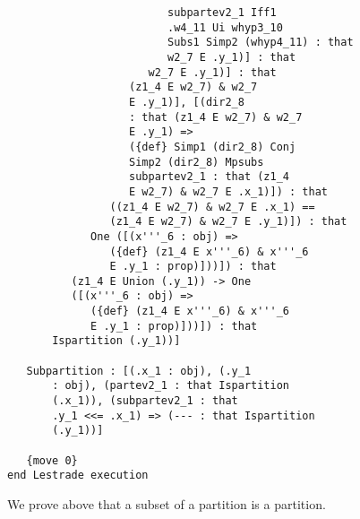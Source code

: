 \documentclass[12pt]{article}
\begin{document}
\begin{verbatim}
                         subpartev2_1 Iff1 
                         .w4_11 Ui whyp3_10 
                         Subs1 Simp2 (whyp4_11) : that 
                         w2_7 E .y_1)] : that 
                      w2_7 E .y_1)] : that 
                   (z1_4 E w2_7) & w2_7 
                   E .y_1)], [(dir2_8 
                   : that (z1_4 E w2_7) & w2_7 
                   E .y_1) => 
                   ({def} Simp1 (dir2_8) Conj 
                   Simp2 (dir2_8) Mpsubs 
                   subpartev2_1 : that (z1_4 
                   E w2_7) & w2_7 E .x_1)]) : that 
                ((z1_4 E w2_7) & w2_7 E .x_1) == 
                (z1_4 E w2_7) & w2_7 E .y_1)]) : that 
             One ([(x'''_6 : obj) => 
                ({def} (z1_4 E x'''_6) & x'''_6 
                E .y_1 : prop)]))]) : that 
          (z1_4 E Union (.y_1)) -> One 
          ([(x'''_6 : obj) => 
             ({def} (z1_4 E x'''_6) & x'''_6 
             E .y_1 : prop)]))]) : that 
       Ispartition (.y_1))]

   Subpartition : [(.x_1 : obj), (.y_1 
       : obj), (partev2_1 : that Ispartition 
       (.x_1)), (subpartev2_1 : that 
       .y_1 <<= .x_1) => (--- : that Ispartition 
       (.y_1))]

   {move 0}
end Lestrade execution
\end{verbatim}

We prove above that a subset of a partition is a partition.
\end{document}

